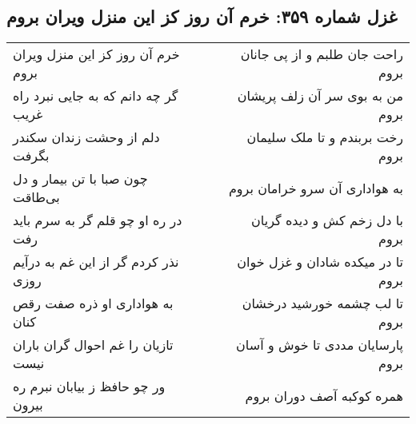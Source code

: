 \begin{center}
\section*{غزل شماره ۳۵۹: خرم آن روز کز این منزل ویران بروم}
\label{sec:sh359}
\begin{longtable}{l p{0.5cm} r}
خرم آن روز کز این منزل ویران بروم
&&
راحت جان طلبم و از پی جانان بروم
\\
گر چه دانم که به جایی نبرد راه غریب
&&
من به بوی سر آن زلف پریشان بروم
\\
دلم از وحشت زندان سکندر بگرفت
&&
رخت بربندم و تا ملک سلیمان بروم
\\
چون صبا با تن بیمار و دل بی‌طاقت
&&
به هواداری آن سرو خرامان بروم
\\
در ره او چو قلم گر به سرم باید رفت
&&
با دل زخم کش و دیده گریان بروم
\\
نذر کردم گر از این غم به درآیم روزی
&&
تا در میکده شادان و غزل خوان بروم
\\
به هواداری او ذره صفت رقص کنان
&&
تا لب چشمه خورشید درخشان بروم
\\
تازیان را غم احوال گران باران نیست
&&
پارسایان مددی تا خوش و آسان بروم
\\
ور چو حافظ ز بیابان نبرم ره بیرون
&&
همره کوکبه آصف دوران بروم
\\
\end{longtable}
\end{center}
